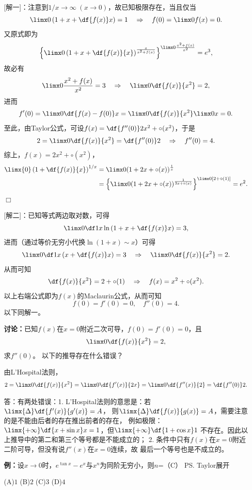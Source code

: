 [解一]：注意到$1/x\to\infty\;(x\to0)$，故已知极限存在，当且仅当
$$\limx0\left(1+x+\df{f(x)}x\right)=1
\quad\Rightarrow\quad f(0)=\limx0f(x)=0.$$
又原式即为
$$\left\{\limx0\left(1+x+\df{f(x)}{x}\right)
^{\frac{x}{x^2+f(x)}}\right\}^{\limx0\frac{x^2+f(x)}{x^2}}=e^3,$$
故必有
$$\limx0\frac{x^2+f(x)}{x^2}=3\quad\Rightarrow\quad
\limx0\df{f(x)}{x^2}=2,$$
进而
$$f'(0)=\limx0\df{f(x)-f(0)}x=\limx0\df{f(x)}{x^2}\limx0x=0.$$
至此，由Taylor公式，可设$f(x)=\df{f''(0)}2x^2+\circ(x^2)$，于是
$$2=\limx0\df{f(x)}{x^2}=\df{f''(0)}2\quad\Rightarrow\quad
f''(0)=4.$$
综上，$f(x)=2x^2+\circ(x^2)$，
\begin{align}
	\limx{0}\left(1+\df{f(x)}{x}\right)^{1/x}
	&=\limx0(1+2x+\circ(x))^{\frac1x}\notag\\
	&=\left\{\limx0(1+2x+\circ(x))^{\frac1{2x+\circ(x)}}\right\}
	^{\limx0{[2+\circ(1)]}}=e^2.\notag	
\end{align}
\hfill$\Box$

[解二]：已知等式两边取对数，可得
$$\limx0\df1x\ln\left(1+x+\df{f(x)}x\right)=3,$$
进而（通过等价无穷小代换$\ln(1+x)\sim x$）可得
$$\limx0\df1x\left(x+\df{f(x)}x\right)=3
\quad\Rightarrow\quad
\limx0\df{f(x)}{x^2}=2.$$
从而可知
$$\df{f(x)}{x^2}=2+\circ(1)
\quad\Rightarrow\quad
f(x)=x^2+\circ(x^2).$$
以上右端公式即为$f(x)$的Maclaurin公式，从而可知
$$f(0)=f'(0)=0,\quad f''(0)=4.$$
以下同解一。\fin

{\bf 讨论：}已知$f(x)$在$x=0$附近二次可导，$f(0)=f'(0)=0$，且
$$\limx0\df{f(x)}{x^2}=2,$$
求$f''(0)$。
以下的推导存在什么错误？

{\color{red}由L'Hospital法则，
$$2=\limx0\df{f(x)}{x^2}=\limx0\df{f'(x)}{2x}
=\limx0\df{f''(x)}{2}=\df{f''(0)}2.$$}

答：有两处错误：1. L'Hospital法则的意思是：若$\limx{\Delta}\df{f'(x)}{g'(x)}=A$，
则$\limx{\Delta}\df{f(x)}{g(x)}=A$，需要注意的是不能由后者的存在推出前者的存在，
例如极限：$\limx{+\infty}\df{x+\sin x}x=1$，但$\limx{+\infty}\df{1+\cos x}1$
不存在。因此以上推导中的第二和第三个等号都是不能成立的；
2. 条件中只有$f(x)$在$x=0$附近二阶可导，但没有说$f''(x)$在$x=0$连续，故
最后一个等号也是不成立的。


{\bf 例：}设$x\to 0$时，$e^{\tan x}-e^x$与$x^n$为同阶无穷小，则$n$=（C）
\ps{Taylor展开}

\quad
(A)\;$1$\hspace{2cm}
(B)\;$2$\hspace{2cm}
(C)\;$3$\hspace{2cm}
(D)\;$4$ 

% 

